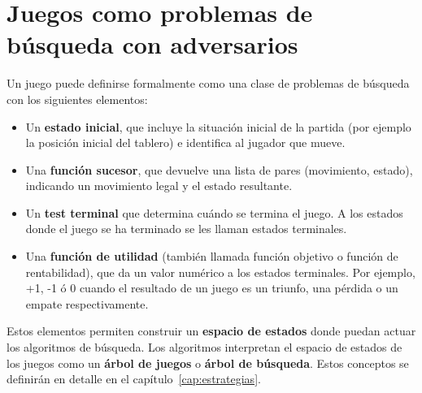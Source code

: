 \section{Juegos como problemas de búsqueda con adversarios}
\label{sec:juegos_problemas_busqueda_adversario}
Un juego puede definirse formalmente como una clase de problemas de búsqueda con los siguientes elementos:
\begin{itemize}
	\item Un \textbf{estado inicial}, que incluye la situación inicial de la partida (por ejemplo la posición inicial del tablero) e identifica al jugador que mueve.
	\item Una \textbf{función sucesor}, que devuelve una lista de pares (movimiento, estado), indicando un movimiento legal y el estado resultante.
	\item Un \textbf{test terminal} que determina cuándo se termina el juego.
	A los estados donde el juego se ha terminado se les llaman estados terminales.
	\item Una \textbf{función de utilidad} (también llamada función objetivo o función de rentabilidad), que da un valor numérico a los estados terminales. Por ejemplo, +1, -1 ó 0 cuando el resultado de un juego es un triunfo, una pérdida o un empate respectivamente.
\end{itemize}
Estos elementos permiten construir un \textbf{espacio de estados} donde puedan actuar los algoritmos de búsqueda.
Los algoritmos interpretan el espacio de estados de los juegos como un  \textbf{árbol de juegos} o \textbf{árbol de búsqueda}.
Estos conceptos se definirán en detalle en el capítulo~\ref{cap:estrategias}.

